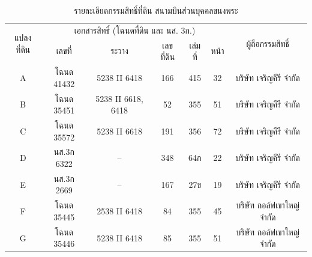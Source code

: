 \begin{table}[h!]
\caption{รายละเอียดกรรมสิทธิ์ที่ดิน สนามบินส่วนบุคคลขนงพระ}
\begin{center}
\begin{tabular}{|c|c|c|c|c|c|c|} %
\hline
\multirow{2}{*}{แปลงที่ดิน}  & \multicolumn{5}{c|}{เอกสารสิทธิ์ (โฉนดที่ดิน และ นส. 3ก.)} & \multirow{2}{*}{ผู้ถือกรรมสิทธิ์}  \\ \cline{2-6}
 & เลขที่ & ระวาง & เลขที่ดิน & เล่มที่ & หน้า  &   \\
 \hline
A & โฉนด 41432 & 5238 II 6418 & 166 & 415 & 32 & บริษัท เจริญคีรี จำกัด \\
B & โฉนด 35451 & 5238 II 6618, 6418 & 52 & 355 & 51 & บริษัท เจริญคีรี จำกัด \\
C & โฉนด 35572 & 5238 II 6618 & 191 & 356 & 72 & บริษัท เจริญคีรี จำกัด \\
D & นส.3ก 6322 & -- & 348 & 64ก & 22 & บริษัท เจริญคีรี จำกัด \\
E & นส.3ก 2669 & -- & 167 & 27ข & 19 & บริษัท เจริญคีรี จำกัด \\
F & โฉนด 35445 & 2538 II 6418 & 84 & 355 & 45 & บริษัท กอล์ฟเขาใหญ่ จำกัด \\
G & โฉนด 35446 & 5238 II 6418 & 85 & 355 & 51 & บริษัท กอล์ฟเขาใหญ่ จำกัด \\
\hline 
\end{tabular}
\end{center}
\label{default}
\end{table}%
